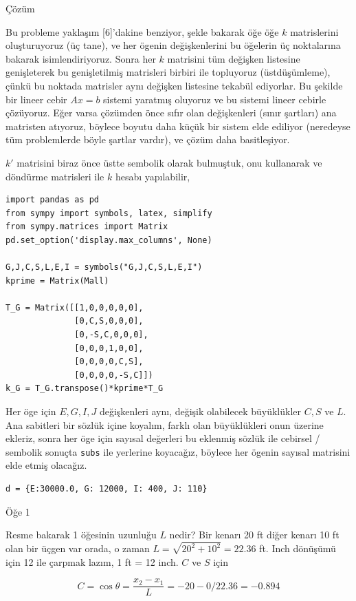 \documentclass[12pt,fleqn]{article}\usepackage{../../common}
\begin{document}
Çözüm

Bu probleme yaklaşım [6]'dakine benziyor, şekle bakarak öğe öğe $k$ matrislerini
oluşturuyoruz (üç tane), ve her ögenin değişkenlerini bu öğelerin üç noktalarına
bakarak isimlendiriyoruz. Sonra her $k$ matrisini tüm değişken listesine
genişleterek bu genişletilmiş matrisleri birbiri ile topluyoruz (üstdüşümleme),
çünkü bu noktada matrisler aynı değişken listesine tekabül ediyorlar. Bu şekilde
bir lineer cebir $Ax = b$ sistemi yaratmış oluyoruz ve bu sistemi lineer cebirle
çözüyoruz. Eğer varsa çözümden önce sıfır olan değişkenleri (sınır şartları) ana
matristen atıyoruz, böylece boyutu daha küçük bir sistem elde ediliyor
(neredeyse tüm problemlerde böyle şartlar vardır), ve çözüm daha basitleşiyor.

$k'$ matrisini biraz önce üstte sembolik olarak bulmuştuk, onu kullanarak ve
döndürme matrisleri ile $k$ hesabı yapılabilir,

\begin{verbatim}
import pandas as pd
from sympy import symbols, latex, simplify
from sympy.matrices import Matrix
pd.set_option('display.max_columns', None)

G,J,C,S,L,E,I = symbols("G,J,C,S,L,E,I")
kprime = Matrix(Mall)

T_G = Matrix([[1,0,0,0,0,0],
              [0,C,S,0,0,0],
              [0,-S,C,0,0,0],
              [0,0,0,1,0,0],
              [0,0,0,0,C,S],
              [0,0,0,0,-S,C]])
k_G = T_G.transpose()*kprime*T_G
\end{verbatim}

Her öge için $E,G,I,J$ değişkenleri aynı, değişik olabilecek büyüklükler $C,S$
ve $L$. Ana sabitleri bir sözlük içine koyalım, farklı olan büyüklükleri onun
üzerine ekleriz, sonra her öge için sayısal değerleri bu eklenmiş sözlük ile
cebirsel / sembolik sonuçta \verb!subs! ile yerlerine koyacağız, böylece her
ögenin sayısal matrisini elde etmiş olacağız.

\begin{verbatim}
d = {E:30000.0, G: 12000, I: 400, J: 110}
\end{verbatim}

Öğe 1

Resme bakarak 1 öğesinin uzunluğu $L$ nedir? Bir kenarı 20 ft diğer kenarı 10 ft
olan bir üçgen var orada, o zaman $L = \sqrt{ 20^2 + 10^2} = 22.36$ ft. Inch
dönüşümü için 12 ile çarpmak lazım, 1 ft = 12 inch. $C$ ve $S$ için

$$
C = \cos \theta = \frac{x_2-x_1}{L} = -20-0 / 22.36 = -0.894
$$
\end{document}
